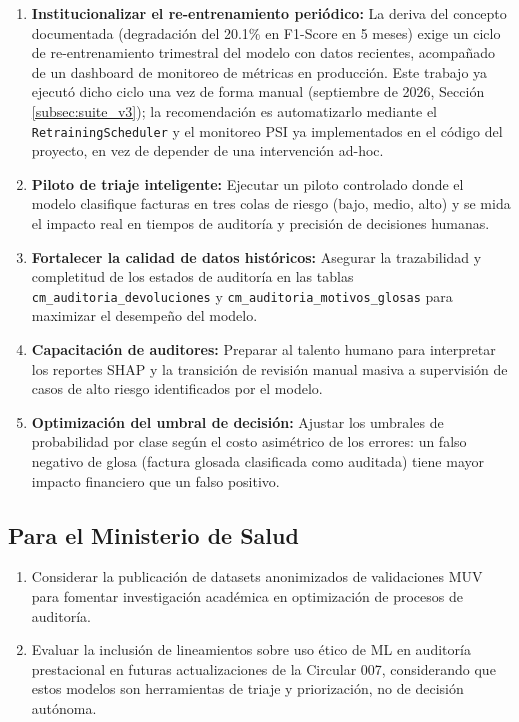\documentclass[12pt,letterpaper]{report}
\begin{document}
\begin{enumerate}
    \item \textbf{Institucionalizar el re-entrenamiento periódico:} La deriva del concepto documentada (degradación del 20.1\% en F1-Score en 5 meses) exige un ciclo de re-entrenamiento trimestral del modelo con datos recientes, acompañado de un dashboard de monitoreo de métricas en producción. Este trabajo ya ejecutó dicho ciclo una vez de forma manual (septiembre de 2026, Sección \ref{subsec:suite_v3}); la recomendación es automatizarlo mediante el \texttt{RetrainingScheduler} y el monitoreo PSI ya implementados en el código del proyecto, en vez de depender de una intervención ad-hoc.

    \item \textbf{Piloto de triaje inteligente:} Ejecutar un piloto controlado donde el modelo clasifique facturas en tres colas de riesgo (bajo, medio, alto) y se mida el impacto real en tiempos de auditoría y precisión de decisiones humanas.

    \item \textbf{Fortalecer la calidad de datos históricos:} Asegurar la trazabilidad y completitud de los estados de auditoría en las tablas \texttt{cm\_auditoria\_devoluciones} y \texttt{cm\_auditoria\_motivos\_glosas} para maximizar el desempeño del modelo.

    \item \textbf{Capacitación de auditores:} Preparar al talento humano para interpretar los reportes SHAP y la transición de revisión manual masiva a supervisión de casos de alto riesgo identificados por el modelo.

    \item \textbf{Optimización del umbral de decisión:} Ajustar los umbrales de probabilidad por clase según el costo asimétrico de los errores: un falso negativo de glosa (factura glosada clasificada como auditada) tiene mayor impacto financiero que un falso positivo.
\end{enumerate}

\subsection*{Para el Ministerio de Salud}

\begin{enumerate}
    \item Considerar la publicación de datasets anonimizados de validaciones MUV para fomentar investigación académica en optimización de procesos de auditoría.

    \item Evaluar la inclusión de lineamientos sobre uso ético de ML en auditoría prestacional en futuras actualizaciones de la Circular 007, considerando que estos modelos son herramientas de triaje y priorización, no de decisión autónoma.
\end{enumerate}
\end{document}
